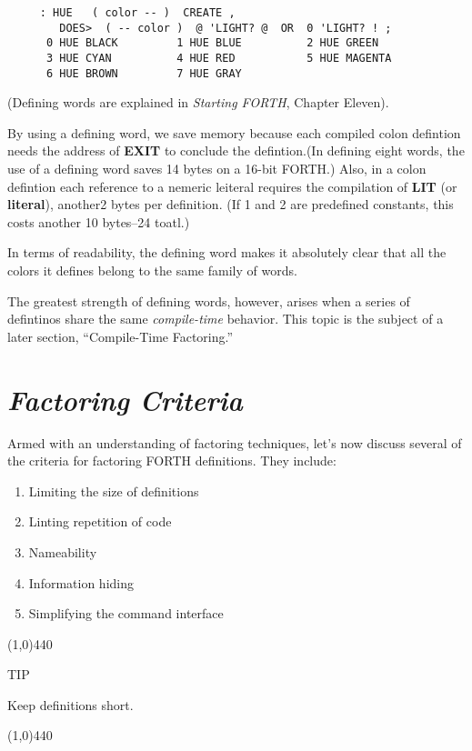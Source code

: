 \documentclass{book}
\begin{document}
\begin{verbatim}
     : HUE   ( color -- )  CREATE ,
        DOES>  ( -- color )  @ 'LIGHT? @  OR  0 'LIGHT? ! ;
      0 HUE BLACK         1 HUE BLUE          2 HUE GREEN
      3 HUE CYAN          4 HUE RED           5 HUE MAGENTA
      6 HUE BROWN         7 HUE GRAY
\end{verbatim}

\noindent 
(Defining words are explained in \textit{Starting FORTH}, Chapter Eleven).

By using a defining word, we save memory because each compiled colon defintion needs the address of \textbf{EXIT} to conclude the defintion.(In defining eight words, the use of a defining word saves 14 bytes on a 16-bit FORTH.) Also, in a colon defintion each reference to a nemeric leiteral requires the compilation of \textbf{LIT} (or \textbf{literal}), another2 bytes per definition. (If 1 and 2 are predefined constants, this costs another 10 bytes--24 toatl.)

In terms of readability, the defining word makes it absolutely clear that all the colors it defines belong to the same family of words.

The greatest strength of defining words, however, arises when a series of defintinos share the same \textit{compile-time} behavior. This topic is the subject of a later section, ``Compile-Time Factoring.''

\section*{\textit{Factoring Criteria}}

Armed with an understanding of factoring techniques, let's now discuss several of the criteria for factoring FORTH definitions. They include:

\begin{enumerate}
\item Limiting the size of definitions
\item Linting repetition of code
\item Nameability
\item Information hiding
\item Simplifying the command interface
\end{enumerate}

\line(1,0){440}

TIP

Keep definitions short.

\line(1,0){440}
\end{document}
